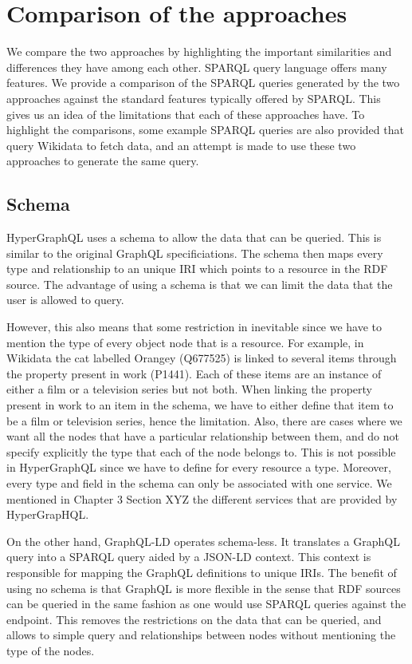 \chapter{Comparison of the approaches}

We compare the two approaches by highlighting the important similarities and differences they have among each other. SPARQL query language offers many features. We provide a comparison of the SPARQL queries generated by the two approaches against the standard features typically offered by SPARQL. This gives us an idea of the limitations that each of these approaches have. To highlight the comparisons, some example SPARQL queries are also provided that query Wikidata to fetch data, and an attempt is made to use these two approaches to generate the same query.

\section{Schema}
HyperGraphQL uses a schema to allow the data that can be queried. This is similar to the original GraphQL specificiations. The schema then maps every type and relationship to an unique IRI which points to a resource in the RDF source. The advantage of using a schema is that we can limit the data that the user is allowed to query. 

However, this also means that some restriction in inevitable since we have to mention the type of every object node that is a resource. For example, in Wikidata the cat labelled Orangey (Q677525) is linked to several items through the property present in work (P1441). Each of these items are an instance of either a film or a television series but not both. When linking the property present in work to an item in the schema, we have to either define that item to be a film or television series, hence the limitation. Also, there are cases where we want all the nodes that have a particular relationship between them, and do not specify explicitly the type that each of the node belongs to. This is not possible in HyperGraphQL since we have to define for every resource a type. Moreover, every type and field in the schema can only be associated with one service. We mentioned in Chapter 3 Section XYZ the different services that are provided by HyperGrapHQL. 

On the other hand, GraphQL-LD operates schema-less. It translates a GraphQL query into a SPARQL query aided by a JSON-LD context. This context is responsible for mapping the GraphQL definitions to unique IRIs. The benefit of using no schema is that GraphQL is more flexible in the sense that RDF sources can be queried in the same fashion as one would use SPARQL queries against the endpoint. This removes the restrictions on the data that can be queried, and allows to simple query and relationships between nodes without mentioning the type of the nodes.

